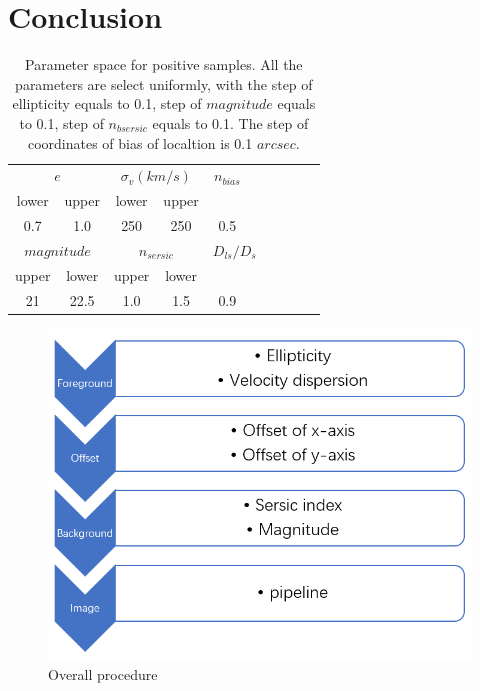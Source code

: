 \documentclass[a4paper,fleqn,usenatbib]{mnras}
\begin{document}
\section{Conclusion}

\begin{table}
	
	\centering
	
	\begin{tabular}{c|c|c|c|c|c|c|c|c|c}
		\hline
		\multicolumn{2}{|c|}{$e$} & \multicolumn{2}{|c|}{$\sigma_v(km/s)$}& \multicolumn{1}{|c|}{$n_{bias}$}
		\\
		\cline{6-10}
		lower & upper &  lower & upper\\
		\hline
		0.7 & 1.0 & 250 & 250 & 0.5 \\
		\hline
		\multicolumn{2}{|c|}{$magnitude$} & \multicolumn{2}{|c|}{$n_{sersic}$} & \multicolumn{2}{|c|}{$D_{ls}/D_s$}
		\\
		\cline{6-10}
		upper & lower & upper & lower\\
		\hline
		21 & 22.5 & 1.0 & 1.5 & 0.9\\
		\hline
	\end{tabular}
	\caption{\label{pos_set3}Parameter space for positive samples. All the parameters are select uniformly, with the step of ellipticity equals to 0.1, step of $magnitude$ equals to 0.1, step of $n_{bsersic}$ equals to 0.1. The step of coordinates of bias of localtion is 0.1 $arcsec$.}
\end{table}

\begin{figure}
\centerline{
  \includegraphics[scale=0.3]{procedure.png}}
  \caption{Overall procedure}
\label{figProcedure}
\end{figure}
\end{document}
